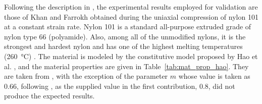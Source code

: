 Following the description in \cite{haoUnifiedAmorphousCrystalline2022}, the experimental results employed for validation are those of Khan and Farrokh \citep{khanThermomechanicalResponseNylon2006} obtained during the uniaxial compression of nylon 101 at a constant strain rate.
Nylon 101 is a standard all-purpose extruded grade of nylon type 66 (polyamide).
Also, among all of the unmodified nylons, it is the strongest and hardest nylon and has one of the highest melting temperatures (\SI{260}{\celsius}) \citep{khanThermomechanicalResponseNylon2006}.
The material is modeled by the constitutive model proposed by Hao et al. \citep{haoUnifiedAmorphousCrystalline2022}, and the material properties are given in Table~\ref{tab:mat_prop_hao}.
They are taken from \cite{haoUnifiedAmorphousCrystalline2022}, with the exception of the parameter $m$ whose value is taken as \num{0.66}, following \cite{haoRatedependentConstitutiveModel2022}, as the supplied value in the first contribution, \num{0.8}, did not produce the expected results.
%
